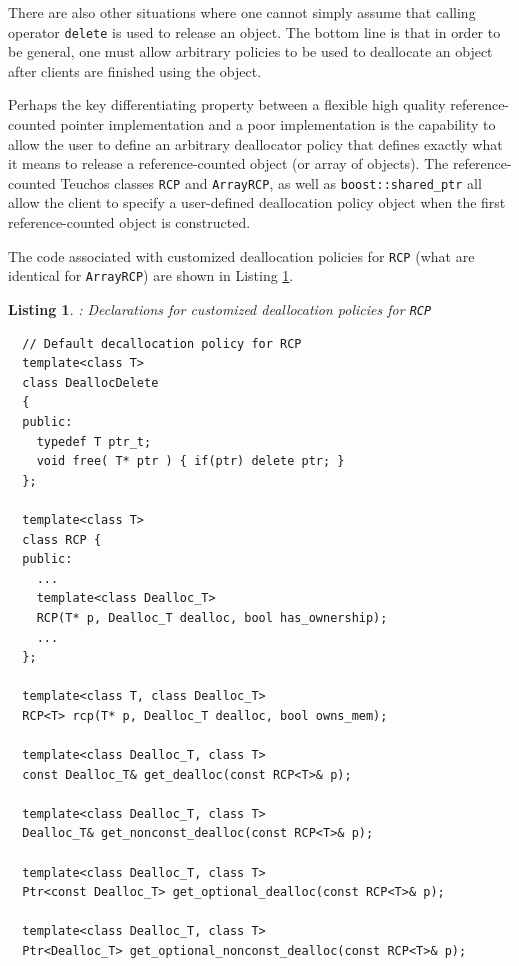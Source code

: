 \documentclass[pdf,ps2pdf,11pt]{SANDreport}
\newtheorem{listing}{Listing}
\begin{document}
There are also other situations where one cannot simply assume that
calling operator {}\texttt{delete} is used to release an object.  The
bottom line is that in order to be general, one must allow arbitrary
policies to be used to deallocate an object after clients are finished
using the object.

Perhaps the key differentiating property between a flexible high
quality reference-counted pointer implementation and a poor
implementation is the capability to allow the user to define an
arbitrary deallocator policy that defines exactly what it means to
release a reference-counted object (or array of objects).  The
reference-counted Teuchos classes {}\texttt{RCP} and
{}\texttt{ArrayRCP}, as well as {}\texttt{boost::shared\_ptr} all
allow the client to specify a user-defined deallocation policy object
when the first reference-counted object is constructed.

The code associated with customized deallocation policies for
{}\texttt{RCP} (what are identical for {}\texttt{ArrayRCP}) are shown
in Listing {}\ref{listing:RCP-dealloc}.

\begin{listing}: Declarations for customized deallocation policies for {}\texttt{RCP} \\
\label{listing:RCP-dealloc}
{\small\begin{verbatim}
  // Default decallocation policy for RCP
  template<class T>
  class DeallocDelete
  {
  public:
    typedef T ptr_t;
    void free( T* ptr ) { if(ptr) delete ptr; }
  };

  template<class T>
  class RCP {
  public:
    ...
    template<class Dealloc_T>
    RCP(T* p, Dealloc_T dealloc, bool has_ownership);
    ...
  };
  
  template<class T, class Dealloc_T>
  RCP<T> rcp(T* p, Dealloc_T dealloc, bool owns_mem);
  
  template<class Dealloc_T, class T>
  const Dealloc_T& get_dealloc(const RCP<T>& p);
  
  template<class Dealloc_T, class T>
  Dealloc_T& get_nonconst_dealloc(const RCP<T>& p);
  
  template<class Dealloc_T, class T>
  Ptr<const Dealloc_T> get_optional_dealloc(const RCP<T>& p);
  
  template<class Dealloc_T, class T> 
  Ptr<Dealloc_T> get_optional_nonconst_dealloc(const RCP<T>& p);

\end{verbatim}}
\end{listing}
\end{document}
